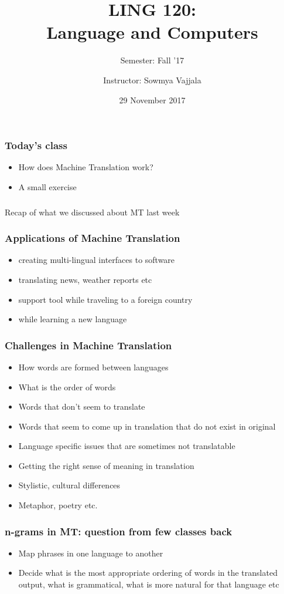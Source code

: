 \documentclass{beamer}
\author[Sowmya Vajjala]{Instructor: Sowmya Vajjala}
\title[LING 120]{LING 120: \\ Language and Computers}
\subtitle{Semester: Fall '17}
\date{29 November 2017}
\institute{Iowa State University, USA}
\begin{document}
\begin{frame}\titlepage
\end{frame}

\begin{frame}
\frametitle{Today's class}
\begin{itemize}
\item How does Machine Translation work?
\item A small exercise %
\end{itemize}
\end{frame}

\begin{frame}
\frametitle{}
\centering
\Large Recap of what we discussed about MT last week
\end{frame}

\begin{frame}
\frametitle{Applications of Machine Translation}
\begin{itemize}
\item creating multi-lingual interfaces to software
\item translating news, weather reports etc
\item support tool while traveling to a foreign country
\item while learning a new language
\end{itemize}
\end{frame}

\begin{frame}
\frametitle{Challenges in Machine Translation}
\begin{itemize}
\item How words are formed between languages
\item What is the order of words
\item Words that don’t seem to translate
\item Words that seem to come up in translation that do not exist in original
\item Language specific issues that are sometimes not translatable
\item Getting the right sense of meaning in translation
\item Stylistic, cultural differences
\item Metaphor, poetry etc.
\end{itemize}
\end{frame}

\begin{frame}
\frametitle{n-grams in MT: question from few classes back}
\begin{itemize}
\item Map phrases in one language to another
\item Decide what is the most appropriate ordering of words in the
translated output, what is grammatical, what is more natural
for that language etc
\end{itemize}
\end{frame}
\end{document}
